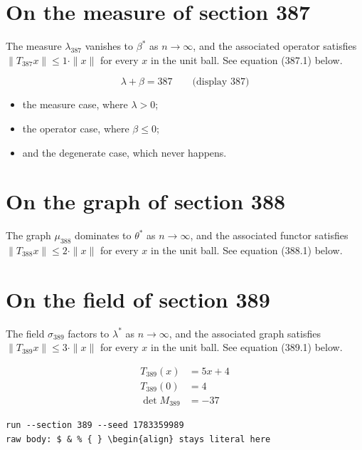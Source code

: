 \documentclass{article}
\begin{document}
\section{On the measure of section 387}
The measure $\lambda_{387}$ vanishes to $\beta^{*}$ as $n \to \infty$,
and the associated operator satisfies $\|T_{387} x\| \leq 1 \cdot \|x\|$
for every $x$ in the unit ball. See equation (387.1) below.

$$
\lambda + \beta = 387 \qquad \text{(display 387)}
$$

\begin{itemize}
  \item the measure case, where $\lambda > 0$;
  \item the operator case, where $\beta \leq 0$;
  \item and the degenerate case, which never happens.
\end{itemize}

\section{On the graph of section 388}
The graph $\mu_{388}$ dominates to $\theta^{*}$ as $n \to \infty$,
and the associated functor satisfies $\|T_{388} x\| \leq 2 \cdot \|x\|$
for every $x$ in the unit ball. See equation (388.1) below.

\section{On the field of section 389}
The field $\sigma_{389}$ factors to $\lambda^{*}$ as $n \to \infty$,
and the associated graph satisfies $\|T_{389} x\| \leq 3 \cdot \|x\|$
for every $x$ in the unit ball. See equation (389.1) below.

\begin{align}
T_{389}(x) &= 5 x + 4 \\
T_{389}(0) &= 4 \\
\det M_{389} &= -37
\end{align}

\begin{verbatim}
run --section 389 --seed 1783359989
raw body: $ & % { } \begin{align} stays literal here
\end{verbatim}
\end{document}
